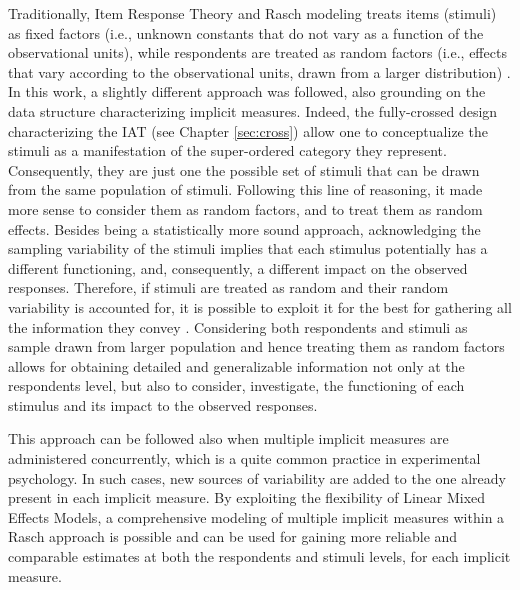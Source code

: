 \documentclass[12pt]{book}
\begin{document}
Traditionally, Item Response Theory and Rasch modeling treats items (stimuli) as fixed factors (i.e., unknown constants that do not vary as a function of the observational units), while respondents are treated as random factors (i.e., effects that vary according to the observational units, drawn from a larger distribution) \cite{DeBoeck2011}.
In this work, a slightly different approach was followed, also grounding on the data structure characterizing implicit measures. 
Indeed, the fully-crossed design characterizing the IAT (see Chapter \ref{sec:cross}) allow one to conceptualize the stimuli as a manifestation of the super-ordered category they represent. Consequently, they are just one the possible set of stimuli that can be drawn from the same population of stimuli.  
Following this line of reasoning, it made more sense to consider them as random factors, and to treat them as random effects.
Besides being a statistically more sound approach,
acknowledging the sampling variability of the stimuli implies that each stimulus potentially has a different functioning, and, consequently, a different impact on the observed responses.
Therefore, if stimuli are treated as random and their random variability is accounted for, it is possible to exploit it for the best for gathering all the information they convey  \cite{wols2017}.
Considering both respondents and stimuli as sample drawn from larger population and hence treating them as random factors  allows for obtaining detailed and generalizable information not only at the respondents level, but also to consider, investigate, the functioning of each stimulus and its impact to the observed responses.

This approach can be followed also when multiple implicit measures are administered concurrently, which is a quite common practice in experimental psychology. 
In such cases, new sources of variability are added to the one already present in each implicit measure. 
By exploiting the flexibility of Linear Mixed Effects Models, a comprehensive modeling of multiple implicit measures within a Rasch approach is possible and can be used for gaining more reliable and comparable estimates at both the respondents and stimuli levels, for each implicit measure. 
\end{document}
